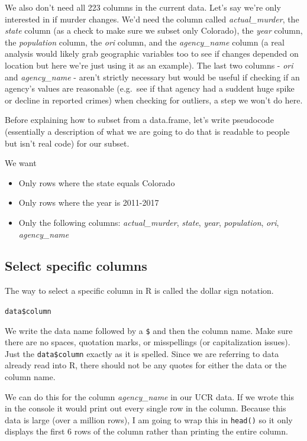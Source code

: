 \documentclass[
]{krantz}
\providecommand{\tightlist}{%
  \setlength{\itemsep}{0pt}\setlength{\parskip}{0pt}}
\begin{document}
We also don't need all 223 columns in the current data. Let's say we're only interested in if murder changes. We'd need the column called \emph{actual\_murder}, the \emph{state} column (as a check to make sure we subset only Colorado), the \emph{year} column, the \emph{population} column, the \emph{ori} column, and the \emph{agency\_name} column (a real analysis would likely grab geographic variables too to see if changes depended on location but here we're just using it as an example). The last two columns - \emph{ori} and \emph{agency\_name} - aren't strictly necessary but would be useful if checking if an agency's values are reasonable (e.g.~see if that agency had a suddent huge spike or decline in reported crimes) when checking for outliers, a step we won't do here.

Before explaining how to subset from a data.frame, let's write pseudocode (essentially a description of what we are going to do that is readable to people but isn't real code) for our subset.

We want

\begin{itemize}
\tightlist
\item
  Only rows where the state equals Colorado
\item
  Only rows where the year is 2011-2017
\item
  Only the following columns: \emph{actual\_murder}, \emph{state}, \emph{year}, \emph{population}, \emph{ori}, \emph{agency\_name}
\end{itemize}

\hypertarget{select-specific-columns}{%
\subsection{Select specific columns}\label{select-specific-columns}}

The way to select a specific column in R is called the dollar sign notation.

\texttt{data\$column}

We write the data name followed by a \texttt{\$} and then the column name. Make sure there are no spaces, quotation marks, or misspellings (or capitalization issues). Just the \texttt{data\$column} exactly as it is spelled. Since we are referring to data already read into R, there should not be any quotes for either the data or the column name.

We can do this for the column \emph{agency\_name} in our UCR data. If we wrote this in the console it would print out every single row in the column. Because this data is large (over a million rows), I am going to wrap this in \texttt{head()} so it only displays the first 6 rows of the column rather than printing the entire column.
\end{document}
